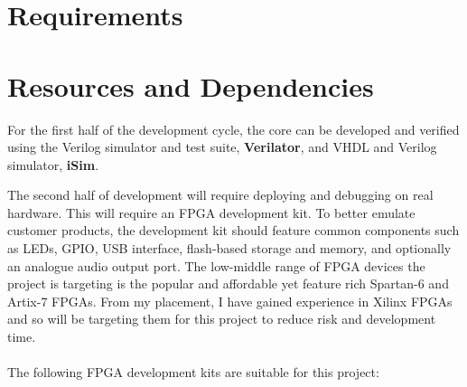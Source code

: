 \documentclass[11pt,a4paper]{report}
\begin{document}

\section{Requirements}

\section{Resources and Dependencies}
For the first half of the development cycle, the core can be developed and verified using the Verilog simulator and test suite, \textbf{Verilator}, and VHDL and Verilog simulator, \textbf{iSim}.

The second half of development will require deploying and debugging on real hardware. This will require an FPGA development kit. To better emulate customer products, the development kit should feature common components such as LEDs, GPIO, USB interface, flash-based storage and memory, and optionally an analogue audio output port. The low-middle range of FPGA devices the project is targeting is the popular and affordable yet feature rich Spartan-6 and Artix-7 FPGAs. From my placement, I have gained experience in Xilinx FPGAs and so will be targeting them for this project to reduce risk and development time.
\\\\
The following FPGA development kits are suitable for this project:
\end{document}

